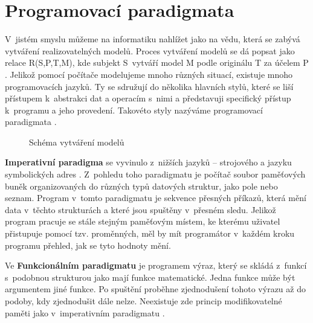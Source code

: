 \documentclass[FP,DP]{tulthesis}
\begin{document}
\section{Programovací paradigmata}
V~jistém smyslu můžeme na informatiku nahlížet jako na vědu, která se zabývá vytváření realizovatelných modelů. Proces vytváření modelů se dá popsat jako relace R(S,P,T,M), kde subjekt S~vytváří model M podle originálu T za účelem P \citep*[s.~135]{didaktikderinformatik}. Jelikož pomocí počítače modelujeme mnoho různých situací, existuje mnoho programovacích jazyků. Ty se sdružují do několika hlavních stylů, které se liší přístupem k~abstrakci dat a operacím s~nimi a představuji specifický přístup k~programu a jeho provedení. Takovéto styly nazýváme programovací paradigmata \citep*[s.~286]{bolshakova}.
\begin{figure}[h!]
\centering
{}

\caption{Schéma vytváření modelů \citep*[s.~135]{didaktikderinformatik}} \label{modely}
\end{figure}

\textbf{Imperativní paradigma} se vyvinulo z~nižších jazyků -- strojového a jazyku symbolických adres \citep*[s.~286]{bolshakova}. Z~pohledu toho paradigmatu je počítač soubor paměťových buněk organizovaných  do různých typů datových struktur, jako pole nebo seznam.  Program v~tomto paradigmatu je sekvence přesných příkazů, která mění data v~těchto strukturách a které jsou spuštěny v~přesném sledu. Jelikož program pracuje se stále stejným paměťovým místem, ke kterému uživatel přistupuje pomocí tzv. proměnných, měl by mít programátor v~každém kroku programu přehled, jak se tyto hodnoty mění. 

Ve \textbf{Funkcionálním paradigmatu}
je programem výraz, který se skládá z~funkcí s~podobnou strukturou jako mají funkce matematické. Jedna funkce může být argumentem jiné funkce. Po spuštění proběhne zjednodušení tohoto výrazu až do podoby, kdy zjednodušit dále nelze.  Neexistuje zde princip modifikovatelné paměti jako v~imperativním paradigmatu \citep*{skavrda}. 
\end{document}
